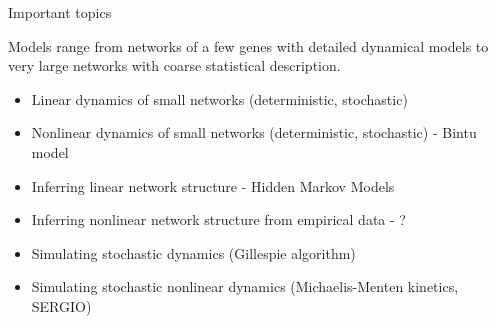 \documentclass[aspectratio=1610]{beamer}					%
\begin{document}
\begin{frame}{Important topics}

Models range from networks of a few genes with detailed dynamical models to very large networks with coarse statistical description.
\vspace{0.2in}

\begin{itemize}
\item Linear dynamics of small networks (deterministic, stochastic)
\item Nonlinear dynamics of small networks (deterministic, stochastic) - Bintu model
\item Inferring linear network structure - Hidden Markov Models
\item Inferring nonlinear network structure from empirical data - ?
\item Simulating stochastic dynamics (Gillespie algorithm)
\item Simulating stochastic nonlinear dynamics (Michaelis-Menten kinetics, SERGIO)
\end{itemize}


\end{frame}
\end{document}
